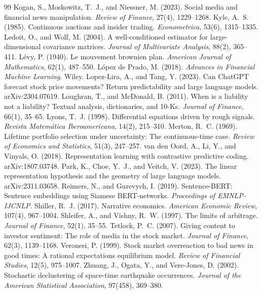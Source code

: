 \documentclass[11pt,a4paper]{article}
\theoremstyle{plain}
\theoremstyle{definition}
\theoremstyle{remark}
\begin{document}
\begin{thebibliography}{99}
 Kogan, S., Moskowitz, T.~J., and Niessner, M. (2023). Social media and financial news manipulation. \emph{Review of Finance}, 27(4), 1229--1268.
 Kyle, A.~S. (1985). Continuous auctions and insider trading. \emph{Econometrica}, 53(6), 1315--1335.
 Ledoit, O., and Wolf, M. (2004). A well-conditioned estimator for large-dimensional covariance matrices. \emph{Journal of Multivariate Analysis}, 88(2), 365--411.
 L\'evy, P. (1940). Le mouvement brownien plan. \emph{American Journal of Mathematics}, 62(1), 487--550.
 L\'opez de Prado, M. (2018). \emph{Advances in Financial Machine Learning}. Wiley.
 Lopez-Lira, A., and Tang, Y. (2023). Can ChatGPT forecast stock price movements? Return predictability and large language models. arXiv:2304.07619.
 Loughran, T., and McDonald, B. (2011). When is a liability not a liability? Textual analysis, dictionaries, and 10-Ks. \emph{Journal of Finance}, 66(1), 35--65.
 Lyons, T.~J. (1998). Differential equations driven by rough signals. \emph{Revista Matem\'atica Iberoamericana}, 14(2), 215--310.
 Merton, R.~C. (1969). Lifetime portfolio selection under uncertainty: The continuous-time case. \emph{Review of Economics and Statistics}, 51(3), 247--257.
 van den Oord, A., Li, Y., and Vinyals, O. (2018). Representation learning with contrastive predictive coding. arXiv:1807.03748.
 Park, K., Choe, Y.~J., and Veitch, V. (2023). The linear representation hypothesis and the geometry of large language models. arXiv:2311.03658.
 Reimers, N., and Gurevych, I. (2019). Sentence-BERT: Sentence embeddings using Siamese BERT-networks. \emph{Proceedings of EMNLP-IJCNLP}.
 Shiller, R.~J. (2017). Narrative economics. \emph{American Economic Review}, 107(4), 967--1004.
 Shleifer, A., and Vishny, R.~W. (1997). The limits of arbitrage. \emph{Journal of Finance}, 52(1), 35--55.
 Tetlock, P.~C. (2007). Giving content to investor sentiment: The role of media in the stock market. \emph{Journal of Finance}, 62(3), 1139--1168.
 Veronesi, P. (1999). Stock market overreaction to bad news in good times: A rational expectations equilibrium model. \emph{Review of Financial Studies}, 12(5), 975--1007.
 Zhuang, J., Ogata, Y., and Vere-Jones, D. (2002). Stochastic declustering of space-time earthquake occurrences. \emph{Journal of the American Statistical Association}, 97(458), 369--380.


\end{thebibliography}
\end{document}
